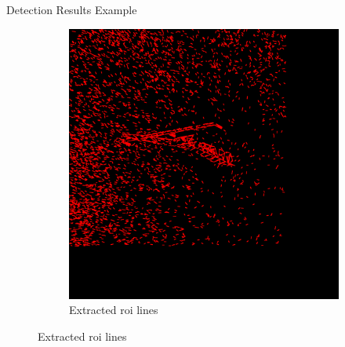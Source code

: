 \documentclass{beamer}
\begin{document}
\begin{frame}[t, fragile]{Detection Results Example}
\begin{figure}
\begin{subfigure}{.5\textwidth}
\includegraphics[scale=0.072]{roi}
\caption{Extracted roi lines}
\end{subfigure}
\end{figure}
\end{frame}
\end{document}
